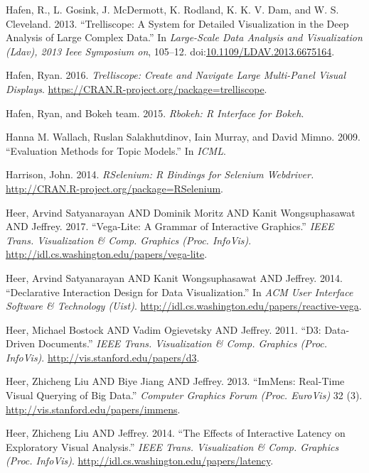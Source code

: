 \documentclass[12pt,]{isuthesis}
\begin{document}
\hypertarget{ref-trelliscope}{}
Hafen, R., L. Gosink, J. McDermott, K. Rodland, K. K. V. Dam, and W. S.
Cleveland. 2013. ``Trelliscope: A System for Detailed Visualization in
the Deep Analysis of Large Complex Data.'' In \emph{Large-Scale Data
Analysis and Visualization (Ldav), 2013 Ieee Symposium on}, 105--12.
doi:\href{https://doi.org/10.1109/LDAV.2013.6675164}{10.1109/LDAV.2013.6675164}.

\hypertarget{ref-trelliscope-pkg}{}
Hafen, Ryan. 2016. \emph{Trelliscope: Create and Navigate Large
Multi-Panel Visual Displays}.
\url{https://CRAN.R-project.org/package=trelliscope}.

\hypertarget{ref-rbokeh}{}
Hafen, Ryan, and Bokeh team. 2015. \emph{Rbokeh: R Interface for Bokeh}.

\hypertarget{ref-Wallach}{}
Hanna M. Wallach, Ruslan Salakhutdinov, Iain Murray, and David Mimno.
2009. ``Evaluation Methods for Topic Models.'' In \emph{ICML}.

\hypertarget{ref-RSelenium}{}
Harrison, John. 2014. \emph{RSelenium: R Bindings for Selenium
Webdriver.} \url{http://CRAN.R-project.org/package=RSelenium}.

\hypertarget{ref-vega-lite}{}
Heer, Arvind Satyanarayan AND Dominik Moritz AND Kanit Wongsuphasawat
AND Jeffrey. 2017. ``Vega-Lite: A Grammar of Interactive Graphics.''
\emph{IEEE Trans. Visualization \& Comp. Graphics (Proc. InfoVis)}.
\url{http://idl.cs.washington.edu/papers/vega-lite}.

\hypertarget{ref-vega}{}
Heer, Arvind Satyanarayan AND Kanit Wongsuphasawat AND Jeffrey. 2014.
``Declarative Interaction Design for Data Visualization.'' In \emph{ACM
User Interface Software \& Technology (Uist)}.
\url{http://idl.cs.washington.edu/papers/reactive-vega}.

\hypertarget{ref-Bostock:2011}{}
Heer, Michael Bostock AND Vadim Ogievetsky AND Jeffrey. 2011. ``D3:
Data-Driven Documents.'' \emph{IEEE Trans. Visualization \& Comp.
Graphics (Proc. InfoVis)}. \url{http://vis.stanford.edu/papers/d3}.

\hypertarget{ref-2013-immens}{}
Heer, Zhicheng Liu AND Biye Jiang AND Jeffrey. 2013. ``ImMens: Real-Time
Visual Querying of Big Data.'' \emph{Computer Graphics Forum (Proc.
EuroVis)} 32 (3). \url{http://vis.stanford.edu/papers/immens}.

\hypertarget{ref-2014-latency}{}
Heer, Zhicheng Liu AND Jeffrey. 2014. ``The Effects of Interactive
Latency on Exploratory Visual Analysis.'' \emph{IEEE Trans.
Visualization \& Comp. Graphics (Proc. InfoVis)}.
\url{http://idl.cs.washington.edu/papers/latency}.
\end{document}
